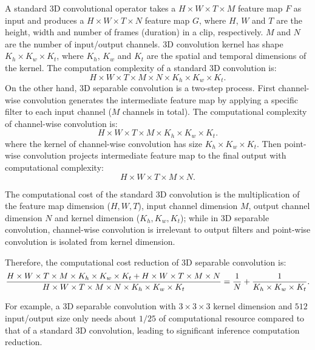 \documentclass{bmvc2k}
\begin{document}
A standard 3D convolutional operator takes a $H\times W\times T\times M$ feature map $F$ as input and produces a $H\times W\times T\times N$ feature map $G$, where $H$, $W$ and $T$ are the height, width and number of frames (duration) in a clip, respectively. $M$ and $N$ are the number of input/output channels. 
3D convolution kernel has shape $K_h \times K_w \times K_t$, 
where $K_h$, $K_w$ and $K_t$ are the spatial and temporal dimensions of the kernel. 
The computation complexity of a standard 3D convolution is:
\begin{equation}
\label{eq:standard_3d_conv_cost}
H\times W\times T\times M\times N\times K_h\times K_w\times K_t.
\end{equation}
On the other hand, 3D separable convolution is a two-step process. First channel-wise convolution generates the intermediate feature map by applying a specific filter to each input channel ($M$ channels in total).  The computational complexity of channel-wise convolution is:
\begin{equation}
H\times W\times T\times M\times K_h \times K_w\times K_t.
\end{equation}
where the kernel of channel-wise convolution has size $K_h \times K_w \times K_t$. Then point-wise convolution projects intermediate feature map to the final output with computational complexity:
\begin{equation}
H\times W \times T \times M\times N.
\end{equation}

The computational cost of the standard 3D convolution is the multiplication of the feature map dimension ($H, W, T$), input channel dimension $M$, output channel dimension $N$ and kernel dimension ($K_h, K_w, K_t$); while in 3D separable convolution, channel-wise convolution is irrelevant to output filters and point-wise convolution is isolated from kernel dimension. 

Therefore, the computational cost reduction of 3D separable convolution is:
\begin{equation}
\small
\frac{H\times W \times T\times M\times K_h\times K_w\times K_t + H\times W \times T\times M\times N}{H\times W\times T\times M\times N\times K_h\times K_w\times K_t} = \frac{1}{N} + \frac{1}{K_h\times K_w\times K_t}.
\end{equation}

For example, a 3D separable convolution with $3\times3\times3$ kernel dimension and $512$ input/output size only needs about $1/25$ of computational resource compared to that of a standard 3D convolution, leading to significant inference computation reduction.
\end{document}
